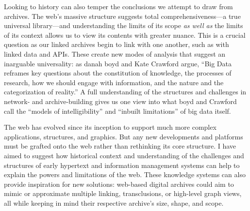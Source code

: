 Looking to history can also temper the conclusions we attempt to draw from archives. The web's massive structure suggests total comprehensiveness---a true universal library---and understanding the limits of its scope \emph{as well as} the limits of its context allows us to view its contents with greater nuance. This is a crucial question as our linked archives begin to link with one another, such as with linked data and APIs. These create new modes of analysis that suggest an inarguable universality: as danah boyd and Kate Crawford argue, ``Big Data reframes key questions about the constitution of knowledge, the processes of research, how we should engage with information, and the nature and the categorization of reality.''\autocite{crawford_critical_2012} A full understanding of the structures and challenges in network- and archive-building gives us one view into what boyd and Crawford call the ``models of intelligibility'' and ``inbuilt limitations'' of big data itself.

The web has evolved since its inception to support much more complex applications, structures, and graphics. But any new developments and platforms must be grafted onto the web rather than rethinking its core structure. I have aimed to suggest how historical context and understanding of the challenges and structures of early hypertext and information management systems can help to explain the powers and limitations of the web. These knowledge systems can also provide inspiration for new solutions: web-based digital archives could aim to mimic or approximate multiple linking, transclusions, or high-level graph views, all while keeping in mind their respective archive's size, shape, and scope.
